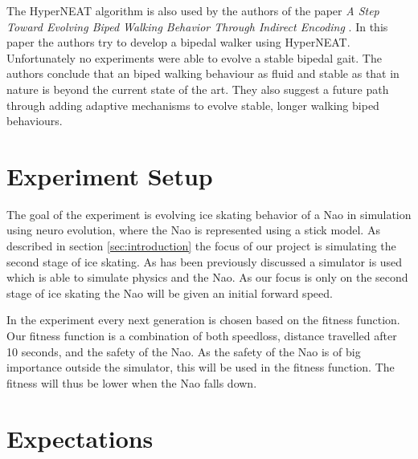 \documentclass[10pt]{article}
\begin{document}
The HyperNEAT algorithm is also used by the authors of the paper \emph{A Step Toward Evolving Biped Walking Behavior Through Indirect Encoding} \cite{steptowardevolvingbipedwalkingbehavior}. In this paper the authors try to develop a bipedal walker using HyperNEAT. Unfortunately no experiments were able to evolve a stable bipedal gait. The authors conclude that an biped walking behaviour as fluid and stable as that in nature is beyond the current state of the art. They also suggest a future path through adding adaptive mechanisms to evolve stable, longer walking biped behaviours. 

\section{Experiment Setup}
\label{sec:experimentsetup}

The goal of the experiment is evolving ice skating behavior of a Nao in simulation using neuro evolution, where the Nao is represented using a stick model. As described in section \ref{sec:introduction} the focus of our project is simulating the second stage of ice skating. As has been previously discussed a simulator is used which is able to simulate physics and the Nao. As our focus is only on the second stage of ice skating the Nao will be given an initial forward speed. 

In the experiment every next generation is chosen based on the fitness function. Our fitness function is a combination of both speedloss, distance travelled after 10 seconds, and the safety of the Nao. As the safety of the Nao is of big importance outside the simulator, this will be used in the fitness function. The fitness will thus be lower when the Nao falls down. 


\section{Expectations}



\end{document}
